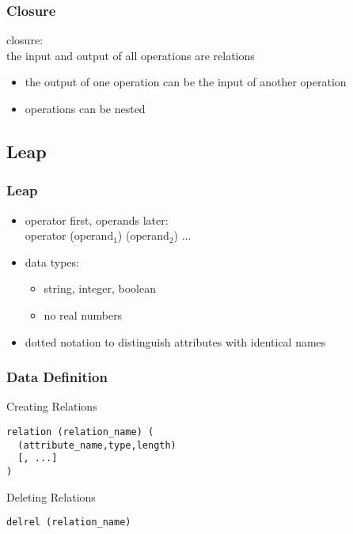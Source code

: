 \documentclass[dvipsnames]{beamer}
\theoremstyle{plain}
\begin{document}
\begin{frame}
  \frametitle{Closure}

  \begin{definition}
    \alert{closure}:\\
      the input and output of all operations are relations
  \end{definition}

  \pause
  \begin{itemize}
    \item the output of one operation can be the input of another operation
    \item operations can be nested
  \end{itemize}
\end{frame}

\subsection*{Leap}

\begin{frame}
  \frametitle{Leap}

  \begin{itemize}
    \item operator first, operands later:\\
      operator (operand$_1$) (operand$_2$) ...

    \pause
    \item data types:
    \begin{itemize}
      \item string, integer, boolean
      \item no real numbers
    \end{itemize}

    \pause
    \item dotted notation to distinguish attributes with identical names
  \end{itemize}
\end{frame}

\begin{frame}[fragile]
  \frametitle{Data Definition}

  \begin{block}{Creating Relations}
    \begin{lstlisting}
relation (relation_name) (
  (attribute_name,type,length)
  [, ...]
)
    \end{lstlisting}
  \end{block}

  \pause
  \begin{block}{Deleting Relations}
    \begin{lstlisting}
delrel (relation_name)
    \end{lstlisting}
  \end{block}
\end{frame}
\end{document}
